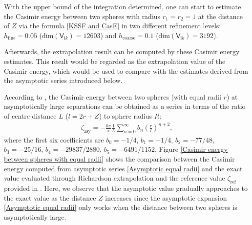 With the upper bound of the integration determined, one can start to estimate the Casimir energy between two spheres with radius $r_1 = r_2 = 1$ at the 
distance of $Z$ via the formula \eqref{KSSF and CasE} in two different refinement levels: $h_{\text{fine}} = 0.05$ 
($\text{dim}(\mathsf{V}_{\mathrm{i}k}) = 12603$) and $h_{\text{coarse}} = 0.1$ ($\text{dim}(\mathsf{V}_{\mathrm{i}k}) = 3192$).

Afterwards, the extrapolation result can be computed by these Casimir energy estimates. This result would be regarded as the extrapolation value of the 
Casimir energy, which would be used to compare with the 
estimates derived from the asymptotic series introduced below. 

According to \cite{emig2008casimir}, the Casimir energy between two spheres (with equal radii $r$) at asymptotically 
large separations can be obtained as a series in terms of the ratio of centre distance $L$ ($l = 2r + Z$) to sphere radius $R$:
\begin{align}\label{Asymptotic equal radii}
   \zeta_{\text{asy}} = -\frac{\hbar c}{\pi}\frac{1}{L}\sum_{n=0}^{\infty}b_{n}\left(\frac{r}{l}\right)^{n+2},
\end{align}
where the first six coefficients are 
$b_{0} = -1/4$, $b_{1} = -1/4$,  $b_{2} = -77/48$,  $b_{3} = -25/16$,  $b_{4} = -29837/2880$, $b_{5} = -6491/1152$. Figure 
\ref{Casimir energy between spheres with equal radii} shows the comparison between the Casimir energy computed from asymptotic series 
\eqref{Asymptotic equal radii} and the exact value evaluated through Richardson extrapolation and the reference value $\zeta_{\text{ref}}$ provided in \cite[Equation (64)]{kenneth2008casimir}. Here, we observe that the asymptotic value gradually 
approaches to the exact value as the distance $Z$ increases since the asymptotic expansion \eqref{Asymptotic equal radii} only works when the distance 
between two spheres is asymptotically large.

